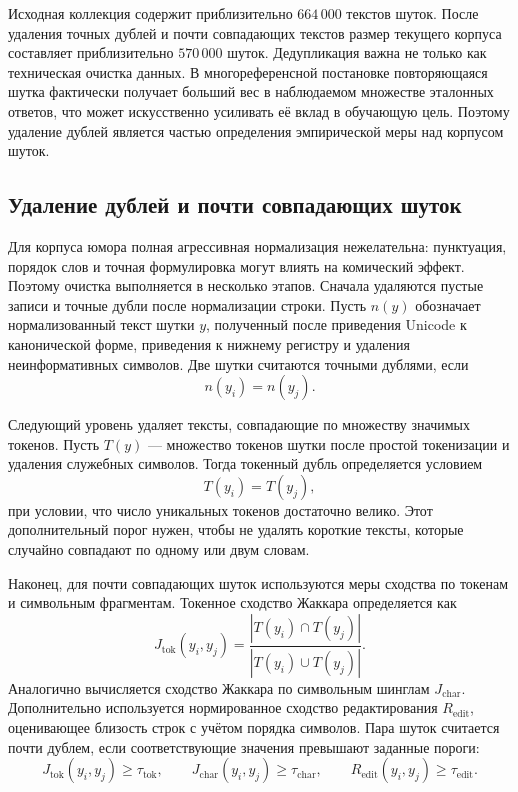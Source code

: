 Исходная коллекция содержит приблизительно \(664\,000\) текстов шуток. После удаления точных дублей и почти совпадающих текстов размер текущего корпуса составляет приблизительно \(570\,000\) шуток. Дедупликация важна не только как техническая очистка данных. В многореференсной постановке повторяющаяся шутка фактически получает больший вес в наблюдаемом множестве эталонных ответов, что может искусственно усиливать её вклад в обучающую цель. Поэтому удаление дублей является частью определения эмпирической меры над корпусом шуток.

\subsection{Удаление дублей и почти совпадающих шуток}

Для корпуса юмора полная агрессивная нормализация нежелательна: пунктуация, порядок слов и точная формулировка могут влиять на комический эффект. Поэтому очистка выполняется в несколько этапов. Сначала удаляются пустые записи и точные дубли после нормализации строки. Пусть \(n(y)\) обозначает нормализованный текст шутки \(y\), полученный после приведения Unicode к канонической форме, приведения к нижнему регистру и удаления неинформативных символов. Две шутки считаются точными дублями, если
\[
    n(y_i)=n(y_j).
\]

Следующий уровень удаляет тексты, совпадающие по множеству значимых токенов. Пусть \(T(y)\) --- множество токенов шутки после простой токенизации и удаления служебных символов. Тогда токенный дубль определяется условием
\[
    T(y_i)=T(y_j),
\]
при условии, что число уникальных токенов достаточно велико. Этот дополнительный порог нужен, чтобы не удалять короткие тексты, которые случайно совпадают по одному или двум словам.

Наконец, для почти совпадающих шуток используются меры сходства по токенам и символьным фрагментам. Токенное сходство Жаккара определяется как
\[
    J_{\mathrm{tok}}(y_i,y_j)
    =
    \frac{|T(y_i)\cap T(y_j)|}{|T(y_i)\cup T(y_j)|}.
\]
Аналогично вычисляется сходство Жаккара по символьным шинглам \(J_{\mathrm{char}}\). Дополнительно используется нормированное сходство редактирования \(R_{\mathrm{edit}}\), оценивающее близость строк с учётом порядка символов. Пара шуток считается почти дублем, если соответствующие значения превышают заданные пороги:
\[
    J_{\mathrm{tok}}(y_i,y_j)\ge \tau_{\mathrm{tok}},
    \qquad
    J_{\mathrm{char}}(y_i,y_j)\ge \tau_{\mathrm{char}},
    \qquad
    R_{\mathrm{edit}}(y_i,y_j)\ge \tau_{\mathrm{edit}}.
\]

